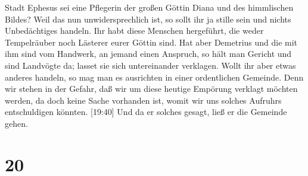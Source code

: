Stadt Ephesus sei eine Pflegerin der großen Göttin Diana und des
himmlischen Bildes?  Weil das nun unwidersprechlich ist, so
sollt ihr ja stille sein und nichts Unbedächtiges handeln. 
Ihr habt diese Menschen hergeführt, die weder Tempelräuber noch Lästerer
eurer Göttin sind.  Hat aber Demetrius und die mit ihm sind
vom Handwerk, an jemand einen Anspruch, so hält man Gericht und sind
Landvögte da; lasset sie sich untereinander verklagen. 
Wollt ihr aber etwas anderes handeln, so mag man es ausrichten in einer
ordentlichen Gemeinde.  Denn wir stehen in der Gefahr, daß
wir um diese heutige Empörung verklagt möchten werden, da doch keine
Sache vorhanden ist, womit wir uns solches Aufruhrs entschuldigen
könnten.  {[}19:40{]} Und da er solches gesagt, ließ er die
Gemeinde gehen.

\hypertarget{section-19}{%
\section{20}\label{section-19}}

